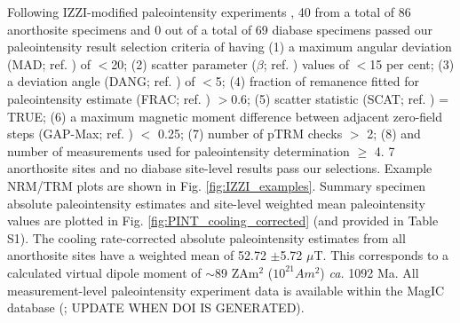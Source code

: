 \documentclass[9pt,twocolumn,twoside,lineno]{pnas-new}
\begin{document}
Following IZZI-modified paleointensity experiments \cite{Yu2004a}, 40 from a total of 86 anorthosite specimens and 0 out of a total of 69 diabase specimens passed our paleointensity result selection criteria of having (1) a maximum angular deviation (MAD; ref. \citealp{Kirschvink1980a}) of $<$20\textdegree; (2) scatter parameter ($\beta$; ref. \citealp{Coe1978a}) values of $<$15 per cent; (3) a deviation angle (DANG; ref. \citealp{Tauxe2004a}) of $<$5\textdegree; (4) fraction of remanence fitted for paleointensity estimate (FRAC; ref. \cite{Shaar2013a}) $>$0.6; (5) scatter statistic (SCAT; ref. \citealp{Shaar2013a}) = TRUE; (6) a maximum magnetic moment difference between adjacent zero-field steps (GAP-Max; ref. \citealp{Shaar2013a}) $<$ 0.25; (7) number of pTRM checks $>$ 2; (8) and number of measurements used for paleointensity determination $\geq$ 4. 7 anorthosite sites and no diabase site-level results pass our selections. Example NRM/TRM plots are shown in Fig. \ref{fig:IZZI_examples}. Summary specimen absolute paleointensity estimates and site-level weighted mean paleointensity values are plotted in Fig. \ref{fig:PINT_cooling_corrected} (and provided in Table S1). The cooling rate-corrected absolute paleointensity estimates from all anorthosite sites have a weighted mean of 52.72 $\pm $5.72 $\mu$T. This corresponds to a calculated virtual dipole moment of $\sim$89 ZAm$^2$ ($10^{21} Am^2$) \textit{ca.} 1092 Ma. All measurement-level paleointensity experiment data is available within the MagIC database (\url{}; UPDATE WHEN DOI IS GENERATED). 
\end{document}
